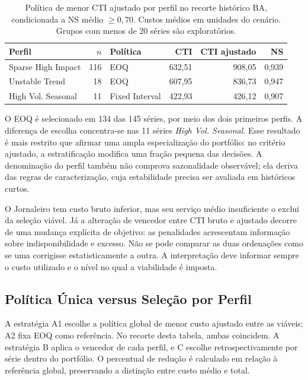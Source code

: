 \begin{table}[ht]
\centering\small
\caption{Política de menor CTI ajustado por perfil no recorte histórico BA, condicionada a NS médio $\geq0{,}70$. Custos médios em unidades do cenário. Grupos com menos de 20 séries são exploratórios.}
\label{tab:dominancia_por_perfil}
\begin{tabular}{@{}lrlrrr@{}}
\toprule
Perfil & $n$ & Política & CTI & CTI ajustado & NS\\
\midrule
Sparse High Impact &116&EOQ&632,51&908,05&0,939\\
Unstable Trend &18&EOQ&607,95&836,73&0,947\\
High Vol. Seasonal &11&Fixed Interval&422,93&426,12&0,907\\
\bottomrule
\end{tabular}
\end{table}

O EOQ é selecionado em 134 das 145 séries, por meio dos dois primeiros perfis. A diferença de escolha concentra-se nas 11 séries \textit{High Vol. Seasonal}. Esse resultado é mais restrito que afirmar uma ampla especialização do portfólio: no critério ajustado, a estratificação modifica uma fração pequena das decisões. A denominação do perfil também não comprova sazonalidade observável; ela deriva das regras de caracterização, cuja estabilidade precisa ser avaliada em históricos curtos.

O Jornaleiro tem custo bruto inferior, mas seu serviço médio insuficiente o exclui da seleção viável. Já a alteração de vencedor entre CTI bruto e ajustado decorre de uma mudança explícita de objetivo: as penalidades acrescentam informação sobre indisponibilidade e excesso. Não se pode comparar as duas ordenações como se uma corrigisse estatisticamente a outra. A interpretação deve informar sempre o custo utilizado e o nível no qual a viabilidade é imposta.

\subsection{Política Única versus Seleção por Perfil}
\label{sec:custo_politica_unica_vs_perfil}

A estratégia A1 escolhe a política global de menor custo ajustado entre as viáveis; A2 fixa EOQ como referência. No recorte desta tabela, ambas coincidem. A estratégia B aplica o vencedor de cada perfil, e C escolhe retrospectivamente por série dentro do portfólio. O percentual de redução é calculado em relação à referência global, preservando a distinção entre custo médio e total.

